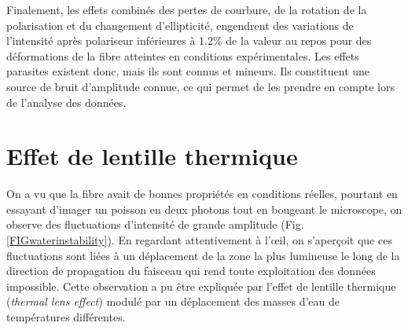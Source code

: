 Finalement, les effets combinés des pertes de courbure, de la rotation de la polarisation et du changement d'ellipticité, engendrent des variations de l'intensité après polariseur inférieures à 1.2\% de la valeur au repos pour des déformations de la fibre atteintes en conditions expérimentales. Les effets parasites existent donc, mais ils sont connus et mineurs. Ils constituent une source de bruit d'amplitude connue, ce qui permet de les prendre en compte lors de l'analyse des données.



\section{Effet de lentille thermique}\label{sectionthermallenseffect}


On a vu que la fibre avait de bonnes propriétés en conditions réelles, pourtant en essayant d'imager un poisson en deux photons tout en bougeant le microscope, on observe des fluctuations d'intensité de grande amplitude (Fig. \ref{FIGwaterinstability}). En regardant attentivement à l'œil, on s'aperçoit que ces fluctuations sont liées à un déplacement de la zone la plus lumineuse le long de la direction de propagation du faisceau qui rend toute exploitation des données impossible. Cette observation a pu être expliquée par l'effet de lentille thermique (\emph{thermal lens effect}) modulé par un déplacement des masses d'eau de températures différentes.

